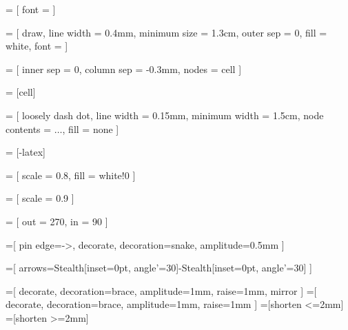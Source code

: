 \newcommand{\true}{\textcolor{green}{\ding{51}}}
\newcommand{\false}{\textcolor{red}{\ding{55}}}

 = [
  font = \large
]

 = [
  draw,
  line width = 0.4mm,
  minimum size = 1.3cm,
  outer sep = 0,
  fill = white,
  font = \large
]

 = [
  inner sep = 0,
  column sep = -0.3mm,
  nodes = cell
]

 = [cell]

 = [
  loosely dash dot,
  line width = 0.15mm,
  minimum width = 1.5cm,
  node contents = $\ldots$,
  fill = none
]

\newcommand{\ellipsis}{ \node [ellipsis]; }

 = [-latex]

 = [
  scale = 0.8,
  fill = white!0
]

 = [
  scale = 0.9
]

 = [
  out = 270,
  in = 90
]

=[
  pin edge={->, decorate, decoration={snake, amplitude=0.5mm}}
]

=[
  arrows={Stealth[inset=0pt, angle'=30]-Stealth[inset=0pt, angle'=30]}
]

\newcommand{\bottommeasure}[4][5mm] {
  \begin{scope}[line width = 0.1mm]
    \coordinate (x) at ([yshift = -#1] #3);
    \draw (x) [measure] -- node [label={[label distance=-1mm]above:#2}] {} (x -| #4);
    \draw (#3) -- ++(0, -#1) -- +(0, -1.25mm);
    \draw (#4) -- ++(0, -#1) -- +(0, -1.25mm);
  \end{scope}
}

=[
  decorate, decoration={brace, amplitude=1mm, raise=1mm, mirror}
]
=[
  decorate, decoration={brace, amplitude=1mm, raise=1mm}
]
=[shorten <=2mm]
=[shorten >=2mm]

\newcommand{\bracetobrace}[4] {
  \coordinate (a) at ([xshift=+0.1em, yshift=-0.5em] #1);
  \coordinate (b) at ([xshift=-0.1em, yshift=-0.5em] #2);
  \coordinate (c) at ([xshift=+0.1em, yshift=0.5em] #3);
  \coordinate (d) at ([xshift=-0.1em, yshift=0.5em] #4);
  \draw [bottombrace] (a) -- coordinate (e) (b);
  \draw [topbrace] (c) -- coordinate (f) (d);
  \draw [from brace, to brace, arrow] (e) -- (f);
}
